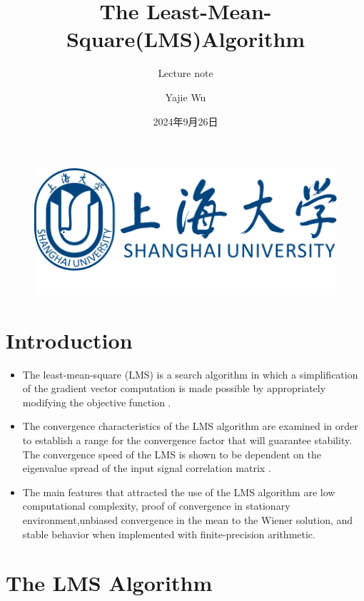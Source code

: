 \documentclass{beamer}
\author{Yajie Wu}
\title{The Least-Mean-Square(LMS)Algorithm}
\subtitle{Lecture note}
\institute{Shanghai University}
\date{2024年9月26日}
\begin{document}
\kaishu
\begin{frame}
    \titlepage
    \begin{figure}[htpb]
        \begin{center}
            \includegraphics[width=0.2\linewidth]{pic/shu.png}
        \end{center}
    \end{figure}
\end{frame}

\begin{frame}
    \tableofcontents[sectionstyle=show,subsectionstyle=show/shaded/hide,subsubsectionstyle=show/shaded/hide]
\end{frame}


\section{Introduction}

\begin{frame}
    \begin{itemize}%
        \item  The least-mean-square (LMS) is a search algorithm in which a simplification of the gradient vector computation is made possible by appropriately modifying the objective function .  
        \item  The convergence characteristics of the LMS algorithm are examined in order to establish a range for the convergence factor
        that will guarantee stability. The convergence speed of the LMS is shown to be dependent on the eigenvalue spread of the
        input signal correlation matrix . 
        \item   The main features that attracted the use of the LMS algorithm are low computational complexity, proof of convergence in stationary environment,unbiased convergence in the mean to the Wiener solution, and stable behavior when implemented with finite-precision arithmetic. 
    \end{itemize}
\end{frame}


\section{The LMS Algorithm}
\end{document}
